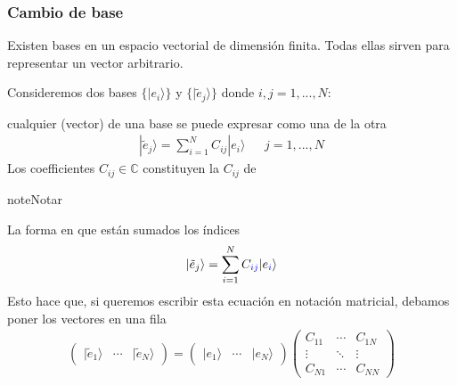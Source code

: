 \documentclass[letterpaper,10pt,english]{jupyterBook}
\newcommand{\ket}[1]{|#1\rangle}
\begin{document}
\subsubsection{Cambio de base}
\label{\detokenize{docs/Part_01_Formalismo/Chapter_01_02_Formalismo_matem_xe1tico/01_02_Vectores_myst:cambio-de-base}}
\sphinxAtStartPar
Existen  bases  en un espacio vectorial de dimensión finita.
Todas ellas sirven para representar un vector arbitrario.

\sphinxAtStartPar
Consideremos dos bases
\(\{\ket{e_i}\}\) y \(\{\ket{\tilde e_j}\}\) donde \( i,j = 1,...,N\):

\sphinxAtStartPar
cualquier  (vector) de una base se puede expresar como una   de la otra
\begin{equation*}
\begin{split}
\ket{\tilde e_j} = \sum_{i=1}^N C_{ i j} \ket{e_i} ~~~~~~~j=1,..., N
\end{split}
\end{equation*}
\sphinxAtStartPar
Los coefficientes  \(C_{ i j}\in {\mathbb C}\) constituyen la  \(C_{ij}\) de 

\begin{sphinxadmonition}{note}{Notar}

\sphinxAtStartPar
La forma en que están sumados los índices
\begin{equation*}
\begin{split}
\ket{\tilde e_j} = \sum_{i=1}^N C_{\color{blue}{i} j} \ket{e_{\color{blue}{i}}}
\end{split}
\end{equation*}
\sphinxAtStartPar
Esto hace que, si queremos escribir esta ecuación en notación matricial,  debamos poner los vectores en una fila
\begin{equation*}
\begin{split}
\begin{pmatrix} \ket{\tilde e_1} & \cdots & \ket{\tilde e_N} \end{pmatrix} = 
\begin{pmatrix} \ket{ e_1} & \cdots & \ket{e_N}\end{pmatrix}
\begin{pmatrix} C_{11} & \cdots & C_{1N} \\ \vdots & \ddots & \vdots \\ C_{N1} & \cdots & C_{NN} \end{pmatrix}
\end{split}
\end{equation*}\end{sphinxadmonition}
\end{document}
